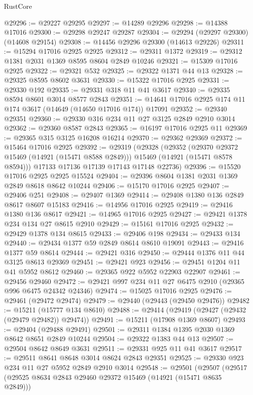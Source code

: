 \begin{lexlean}{RustCore}
\begin{coremodule}
@29296 := @29227 @29295
@29297 := @14289 @29296
@29298 := @14388 @17016
@29300 := @29298 @29247 @29287
@29304 := @29294 (@29297 @29300) (@14608 @29154)
@29308 := @14456 @29296 @29300 (@14613 @29226)
@29311 := @15294 @17016 @2925 @2925
@29312 := @29311 @1372
@29319 := @29312 @1381 @2031 @1369 @8595 @8604 @2849 @10246
@29321 := @15309 @17016 @2925
@29322 := @29321 @532
@29325 := @29322 @1371 @44 @13
@29328 := @29325 @8595 @8602 @3631
@29330 := @15322 @17016 @2925
@29331 := @29330 @192
@29335 := @29331 @318 @11 @41 @3617
@29340 := @29335 @8594 @8601 @3014 @8577 @2843
@29351 := @14641 @17016 @2925 @174 @11 @174 @3617 (@14649 (@14650 @17016 @174)) @17091
@29352 := @29340 @29351
@29360 := @29330 @316 @234 @11 @27 @3125 @2849 @2910 @3014
@29362 := @29360 @8587 @2843
@29365 := @16197 @17016 @2925 @11
@29369 := @29365 @315 @3125 @16208 @16214
@29370 := @29362 @29369
@29372 := @15464 @17016 @2925
@29392 := @29319
    (@29328
      (@29352
        (@29370 @29372 @15469 (@14921 (@15471 @8588 @2849)))
        @15469
        (@14921 (@15471 @8578 @8594)))
      @17133
      @17136
      @17139
      @17143
      @17148
      @22736)
@29396 := @15520 @17016 @2925 @2925 @15524
@29404 := @29396 @8604 @1381 @2031 @1369 @2849 @8618 @8642 @10244
@29406 := @15170 @17016 @2925
@29407 := @29406 @251
@29408 := @29407 @1369
@29414 := @29408 @1380 @136 @2849 @8617 @8607 @15183
@29416 := @14956 @17016 @2925
@29419 := @29416 @1380 @136 @8617
@29421 := @14965 @17016 @2925
@29427 := @29421 @1378 @234 @134 @27 @8615 @2910
@29429 := @15161 @17016 @2925
@29432 := @29429 @1378 @134 @8615
@29433 := @29406 @198
@29434 := @29433 @134
@29440 := @29434 @1377 @59 @2849 @8614 @8610 @19091
@29443 := @29416 @1377 @59 @8614
@29444 := @29421 @316
@29450 := @29444 @1376 @11 @44 @3125 @8613 @29369
@29451 := @29421 @923
@29456 := @29451 @1204 @11 @41 @5952 @8612
@29460 := @29365 @922 @5952 @22903 @22907
@29461 := @29456 @29460
@29472 := @29421 @997 @234 @11 @27 @6475 @2910 (@29365 @996 @6475 @24342 @24346)
@29474 := @15025 @17016 @2925
@29476 := @29461 (@29472 @29474)
@29479 := @29440 (@29443 (@29450 @29476))
@29482 := @15211 (@15777 @134 @8610)
@29488 := @29414 (@29419 (@29427 (@29432 (@29479 @29482)) @29474))
@29491 := @15211 (@17908 @1369 @8607)
@29493 := @29404 (@29488 @29491)
@29501 := @29311 @1384 @1395 @2030 @1369 @8642 @8651 @2849 @10244
@29504 := @29322 @1383 @44 @13
@29507 := @29504 @8642 @8649 @3631
@29511 := @29331 @925 @11 @41 @3617
@29517 := @29511 @8641 @8648 @3014 @8624 @2843 @29351
@29525 := @29330 @923 @234 @11 @27 @5952 @2849 @2910 @3014
@29548 := @29501
    (@29507
      (@29517
        (@29525 @8634 @2843 @29460 @29372 @15469 (@14921 (@15471 @8635 @2849)))

\end{coremodule}
\end{lexlean}
